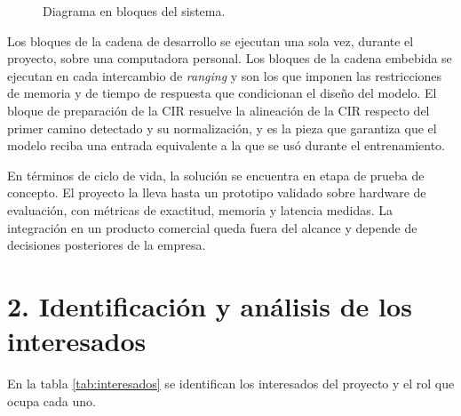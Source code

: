 \documentclass[
11pt, %
]{charter}
\begin{document}
\begin{figure}[htpb]
\caption{Diagrama en bloques del sistema.}
\label{fig:diagBloques}
\end{figure}

Los bloques de la cadena de desarrollo se ejecutan una sola vez, durante el proyecto, sobre una computadora personal. Los bloques de la cadena embebida se ejecutan en cada intercambio de \textit{ranging} y son los que imponen las restricciones de memoria y de tiempo de respuesta que condicionan el diseño del modelo. El bloque de preparación de la CIR resuelve la alineación de la CIR respecto del primer camino detectado y su normalización, y es la pieza que garantiza que el modelo reciba una entrada equivalente a la que se usó durante el entrenamiento.

En términos de ciclo de vida, la solución se encuentra en etapa de prueba de concepto. El proyecto la lleva hasta un prototipo validado sobre hardware de evaluación, con métricas de exactitud, memoria y latencia medidas. La integración en un producto comercial queda fuera del alcance y depende de decisiones posteriores de la empresa.

\section{2. Identificación y análisis de los interesados}
\label{sec:interesados}

En la tabla \ref{tab:interesados} se identifican los interesados del proyecto y el rol que ocupa cada uno.
\end{document}
